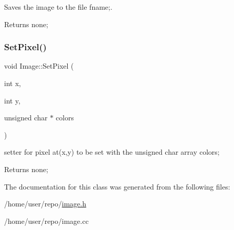 Saves the image to the file fname;. 

\begin{DoxyReturn}{Returns}
none; 
\end{DoxyReturn}
\mbox{\label{classImage_a70147670b58d1b095e5c38b1f8bfb2db}} 
\subsubsection{\texorpdfstring{Set\+Pixel()}{SetPixel()}}
{\footnotesize\ttfamily void Image\+::\+Set\+Pixel (\begin{DoxyParamCaption}\item[{int}]{x,  }\item[{int}]{y,  }\item[{unsigned char $\ast$}]{colors }\end{DoxyParamCaption})}



setter for pixel at(x,y) to be set with the unsigned char array colors; 

\begin{DoxyReturn}{Returns}
none; 
\end{DoxyReturn}


The documentation for this class was generated from the following files\+:\begin{DoxyCompactItemize}
\item 
/home/user/repo/\hyperlink{image_8h}{image.\+h}\item 
/home/user/repo/image.\+cc\end{DoxyCompactItemize}
